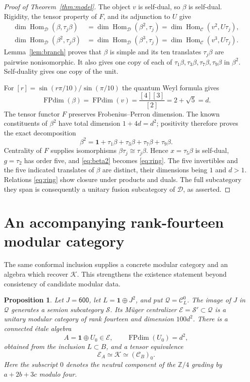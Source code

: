 \documentclass[11pt]{amsart}
\newtheorem{proposition}[theorem]{Proposition}
\theoremstyle{remark}
\newcommand{\C}{\mathcal C}
\newcommand{\D}{\mathcal D}
\newcommand{\K}{\mathcal K}
\newcommand{\E}{\mathcal E}
\newcommand{\Q}{\mathcal Q}
\newcommand{\FPdim}{\operatorname{FPdim}}
\newcommand{\Hom}{\operatorname{Hom}}
\newcommand{\wt}[1]{\mathsf{#1}}
\newcommand{\one}{\mathbf 1}
\begin{document}
\begin{proof}[Proof of Theorem~\ref{thm:model}]
The object $v$ is self-dual, so $\beta$ is self-dual. Rigidity, the tensor
property of $F$, and its adjunction to $U$ give
\begin{align*}
 \dim\Hom_{\D}(\beta,\tau_j\beta)
 &=\dim\Hom_{\D}(\beta^2,\tau_j)
 =\dim\Hom_{\C}(v^2,U\tau_j),\\
 \dim\Hom_{\D}(\beta^2,\tau_j\beta)
 &=\dim\Hom_{\D}(\beta^3,\tau_j)
 =\dim\Hom_{\C}(v^3,U\tau_j).
\end{align*}
Lemma~\ref{lem:branch} proves that $\beta$ is simple and its ten
translates $\tau_j\beta$ are pairwise nonisomorphic. It also gives one
copy of each of $\tau_1\beta,\tau_3\beta,\tau_7\beta,\tau_9\beta$ in
$\beta^2$. Self-duality gives one copy of the unit.

For $[r]=\sin(r\pi/10)/\sin(\pi/10)$ the quantum Weyl formula gives
\[
 \FPdim(\beta)=\FPdim(v)=\frac{[4][3]}{[2]}=2+\sqrt5=d.
\]
The tensor functor $F$ preserves Frobenius--Perron dimension. The known
constituents of $\beta^2$ have total dimension $1+4d=d^2$; positivity
therefore proves the exact decomposition
\begin{equation}\label{eq:beta2}
 \beta^2=\one+\tau_1\beta+\tau_3\beta+\tau_7\beta+\tau_9\beta.
\end{equation}
Centrality of $F$ supplies isomorphisms $\beta\tau_j\cong\tau_j\beta$.
Hence $x=\tau_5\beta$ is self-dual, $g=\tau_2$ has order five, and
\eqref{eq:beta2} becomes \eqref{eq:ring}. The five invertibles and the
five indicated translates of $\beta$ are distinct, their dimensions
being $1$ and $d>1$. Relations \eqref{eq:ring} show closure under
products and duals. The full subcategory they span is consequently a
unitary fusion subcategory of $\D$, as asserted.
\end{proof}

\section{An accompanying rank-fourteen modular category}
\label{sec:fourteen}

The same conformal inclusion supplies a concrete modular category and
an algebra which recover $\K$. This strengthens the existence statement
beyond consistency of candidate modular data.

\begin{proposition}\label{prop:fourteen}
Let $J=\wt{600}$, let $L=\one\oplus J^2$, and put $\Q=\C_L^0$.
The image of $J$ in $\Q$ generates a semion subcategory $\mathcal S$.
Its M\"uger centralizer $\E=\mathcal S'\subset\Q$ is a unitary modular
category of rank fourteen and dimension $100d^2$. There is a connected
\'etale algebra
\[
 A=\one\oplus U_0\in\E,\qquad \FPdim(U_0)=d^2,
\]
obtained from the inclusion $L\subset B$, and a tensor equivalence
\[
 \E_A\simeq\K\simeq(\C_B)_0.
\]
Here the subscript $0$ denotes the neutral component of the
$\mathbb Z/4$ grading by $a+2b+3c$ modulo four.
\end{proposition}
\end{document}
